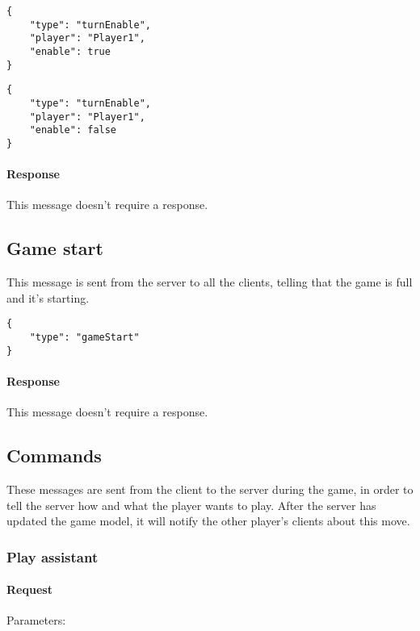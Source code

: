 \documentclass[a4paper]{article}
\begin{document}
	\begin{multicols}{2}
		\begin{verbatim}
{
	"type": "turnEnable",
	"player": "Player1",
	"enable": true
}
		\end{verbatim}
		\begin{verbatim}
{
	"type": "turnEnable",
	"player": "Player1",
	"enable": false
}
		\end{verbatim}
	\end{multicols}

	\paragraph{Response} This message doesn't require a response.
	
	\pagebreak

	\subsection{Game start}

	This message is sent from the server to all the clients, telling that the game is full and it's starting.

	\begin{multicols}{2}
		\begin{verbatim}
{
	"type": "gameStart"
}
		\end{verbatim}
	\end{multicols}

	\paragraph{Response} This message doesn't require a response.

	\subsection{Commands}

	These messages are sent from the client to the server during the game, in order to tell the server how and what the player wants to play. After the server has updated the game model, it will notify the other player's clients about this move.

	\subsubsection{Play assistant}

	\paragraph{Request} Parameters:
\end{document}
